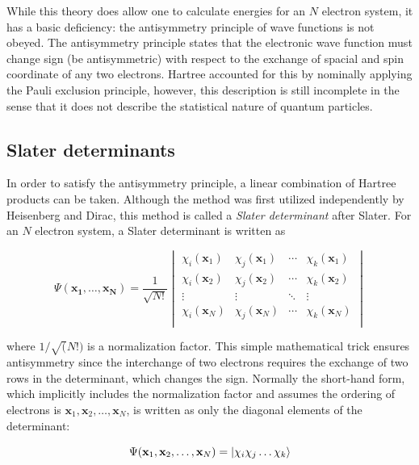 While this theory does allow one to calculate energies for an $N$ electron
system, it has a basic deficiency: the antisymmetry principle of wave functions
is not obeyed. The antisymmetry principle states that the electronic wave
function must change sign (be antisymmetric) with respect to the exchange of
spacial and spin coordinate of any two electrons. Hartree accounted for this by
nominally applying the Pauli exclusion principle, however, this description is
still incomplete in the sense that it does not describe the statistical nature
of quantum particles.

\subsection{Slater determinants}

In order to satisfy the antisymmetry principle, a linear combination of Hartree
products can be taken. Although the method was first utilized independently by
Heisenberg\cite{Heisenberg1926} and Dirac,\cite{Dirac1926} this method is
called a \emph{Slater determinant} after Slater.\cite{Slater1929} For an $N$
electron system, a Slater determinant is written as

\begin{equation}
\Psi(\mathbf{x_1},\ldots,\mathbf{x_N}) = \frac{1}{\sqrt{N!}}
\begin{vmatrix}
\chi_i(\mathbf{x}_1) & \chi_j(\mathbf{x}_1) & \cdots & \chi_k(\mathbf{x}_1) \\
\chi_i(\mathbf{x}_2) & \chi_j(\mathbf{x}_2) & \cdots & \chi_k(\mathbf{x}_2) \\
\vdots & \vdots & \ddots & \vdots \\
\chi_i(\mathbf{x}_N) & \chi_j(\mathbf{x}_N) & \cdots & \chi_k(\mathbf{x}_N) \\
\end{vmatrix}
\end{equation}

\noindent where $1/\sqrt(N!)$ is a normalization factor. This simple
mathematical trick ensures antisymmetry since the interchange of two electrons
requires the exchange of two rows in the determinant, which changes the sign.
Normally the short-hand form, which implicitly includes the normalization
factor and assumes the ordering of electrons is
$\mathbf{x}_1,\mathbf{x}_2,\dots,\mathbf{x}_N$, is written as only the diagonal
elements of the determinant:

\begin{equation}
  \Psi(\mathbf{x}_1,\mathbf{x}_2,\dots,\mathbf{x}_N) = \ket{\chi_i\chi_j\dots\chi_k}
\end{equation}

